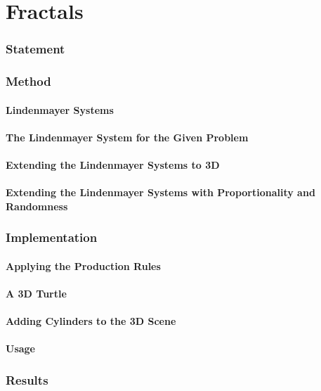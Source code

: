 \part{Fractals}

\section{Statement}

\section{Method}
\subsection{Lindenmayer Systems}
\subsection{The Lindenmayer System for the Given Problem}
\subsection{Extending the Lindenmayer Systems to 3D}
\subsection{Extending the Lindenmayer Systems with Proportionality and Randomness}

\section{Implementation}
\subsection{Applying the Production Rules}
\subsection{A 3D Turtle}
\subsection{Adding Cylinders to the 3D Scene}
\subsection{Usage}

\section{Results}
